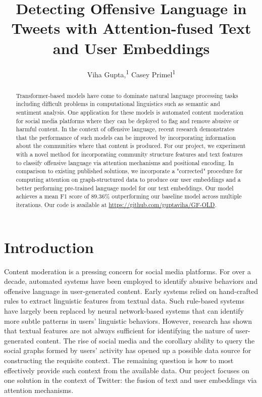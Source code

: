 \documentclass[letterpaper]{article} %
\title{Detecting Offensive Language in Tweets with Attention-fused Text and User Embeddings}
\author {
    Viha Gupta,\textsuperscript{\rm 1}
    Casey Primel\textsuperscript{\rm 1}
}
\begin{document}
\maketitle

\begin{abstract}
    Transformer-based models have come to dominate natural language processing tasks including difficult problems in computational linguistics such as semantic and sentiment analysis. One application for these models is automated content moderation for social media platforms where they can be deployed to flag and remove abusive or harmful content. In the context of offensive language, recent research demonstrates that the performance of such models can be improved by incorporating information about the communities where that content is produced. For our project, we experiment with a novel method for incorporating community structure features and text features to classify offensive language via attention mechanisms and positional encoding. In comparison to existing published solutions, we incorporate a "corrected" procedure for computing attention on graph-structured data to produce our user embeddings and a better performing pre-trained language model for our text embeddings. Our model achieves a mean F1 score of 89.36\% outperforming our baseline model across multiple iterations. Our code is available at \url{https://github.com/guptaviha/GF-OLD}.
\end{abstract}

\section{Introduction}

Content moderation is a pressing concern for social media platforms. For over a decade, automated systems have been employed to identify abusive behaviors and offensive language in user-generated content. Early systems relied on hand-crafted rules to extract linguistic features from textual data. Such rule-based systems have largely been replaced by neural network-based systems that can identify more subtle patterns in users' linguistic behaviors. However, research has shown that textual features are not always sufficient for identifying the nature of user-generated content. The rise of social media and the corollary ability to query the social graphs formed by users' activity has opened up a possible data source for constructing the requisite context. The remaining question is how to most effectively provide such context from the available data. Our project focuses on one solution in the context of Twitter: the fusion of text and user embeddings via attention mechanisms.
\end{document}
